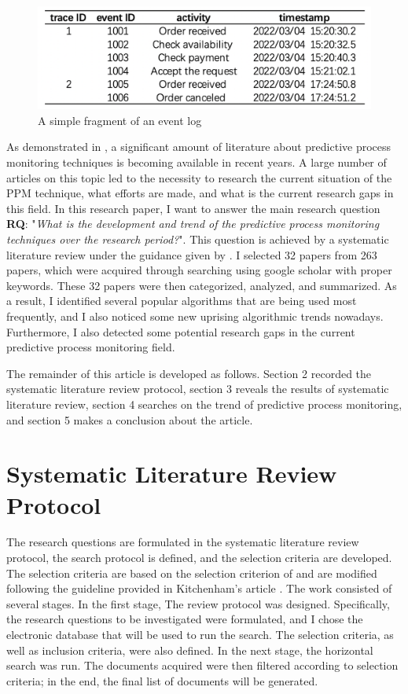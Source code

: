 \documentclass[runningheads]{llncs}
\begin{document}
		\begin{figure}
		\includegraphics[scale=0.4]{event_logs.png}
		\centering
		\caption{A simple fragment of an event log} 
		\end{figure}
	
		As demonstrated in \cite{original}, a significant amount of literature about predictive process monitoring techniques is becoming available in recent years. A large number of articles on this topic led to the necessity to research the current situation of the PPM technique, what efforts are made, and what is the current research gaps in this field.	In this research paper, I want to answer the main research question \textbf{RQ}: "\textit{What is the development and trend of the predictive process monitoring techniques over the research period?}". This question is achieved by a systematic literature review under the guidance given by \cite{guideline}. I selected 32 papers from 263 papers, which were acquired through searching using google scholar with proper keywords. These 32 papers were then categorized, analyzed, and summarized. As a result, I identified several popular algorithms that are being used most frequently, and I also noticed some new uprising algorithmic trends nowadays. Furthermore, I also detected some potential research gaps in the current predictive process monitoring field. 
	
		The remainder of this article is developed as follows. Section 2 recorded the systematic literature review protocol, section 3 reveals the results of systematic literature review, section 4 searches on the trend of predictive process monitoring, and section 5 makes a conclusion about the article. 
	
	\section{Systematic Literature Review Protocol}
		The research questions are formulated in the systematic literature review protocol, the search protocol is defined, and the selection criteria are developed. The selection criteria are based on the selection criterion of \cite{original} and are modified following the guideline provided in Kitchenham's article \cite{guideline}. The work consisted of several stages. In the first stage, The review protocol was designed. Specifically, the research questions to be investigated were formulated, and I chose the electronic database that will be used to run the search. The selection criteria, as well as inclusion criteria, were also defined. In the next stage, the horizontal search was run. The documents acquired were then filtered according to selection criteria; in the end, the final list of documents will be generated.
		
\end{document}
